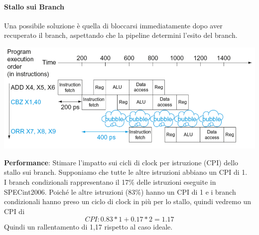 \documentclass[12pt,a4paper]{article}
\begin{document}
\paragraph{Stallo sui Branch}
Una possibile soluzione è quella di bloccarsi immediatamente dopo aver recuperato il branch, aspettando che la pipeline determini l'esito del branch.
\begin{center}
\includegraphics[width=0.6\columnwidth]{img/stall_branch.png}
\end{center}
\textbf{Performance}: Stimare l'impatto sui cicli di clock per istruzione (CPI) dello stallo sui branch. Supponiamo che tutte le altre istruzioni abbiano un CPI di 1.\\
I branch condizionali rappresentano il 17\% delle istruzioni eseguite in SPECint2006. Poiché le altre istruzioni (83\%) hanno un CPI di 1 e i branch condizionali hanno preso un ciclo di clock in più per lo stallo, quindi vedremo un CPI di
$$CPI:0.83*1+0.17*2=1.17$$
Quindi un rallentamento di 1,17 rispetto al caso ideale.
\end{document}
